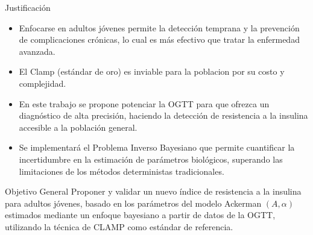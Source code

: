 \documentclass{beamer}
\begin{document}
    \begin{frame}{Justificación}
        \justifying
		\begin{itemize}
            \item Enfocarse en adultos jóvenes permite la detección temprana y la prevención de complicaciones crónicas, lo cual es más efectivo que tratar la enfermedad avanzada.
            \vspace{0.2cm}
            \item El Clamp (estándar de oro) es inviable para la poblacion por su costo y complejidad.
            \vspace{0.2cm}
            \item En este trabajo se propone potenciar la OGTT %
            para que ofrezca un diagnóstico de alta precisión, haciendo la detección de resistencia a la insulina accesible a la población general.
            \vspace{0.2cm}
            \item Se implementará el Problema Inverso Bayesiano que permite cuantificar la incertidumbre en la estimación de parámetros biológicos, superando las limitaciones de los métodos deterministas tradicionales.
		\end{itemize}
	\end{frame}


    \begin{frame}{Objetivo General}
        \justifying
		Proponer y validar un nuevo índice de resistencia a la insulina para adultos jóvenes, basado en los parámetros del modelo Ackerman $(A, \alpha)$ estimados mediante un enfoque bayesiano a partir de datos de la OGTT,  utilizando la técnica de CLAMP como estándar de referencia.
	\end{frame}

\end{document}
